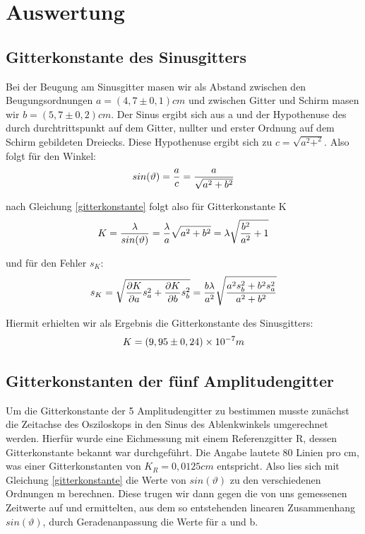 \documentclass[12pt]{article}
\begin{document}
\newpage

\section{Auswertung}
\subsection{Gitterkonstante des Sinusgitters}
Bei der Beugung am Sinusgitter masen wir als Abstand zwischen den Beugungsordnungen $a=(4,7 \pm 0,1)cm$ und zwischen Gitter und Schirm masen wir $b=(5,7\pm0,2)cm$. Der Sinus ergibt sich aus a und der Hypothenuse des durch durchtrittspunkt auf dem Gitter, nullter und erster Ordnung auf dem Schirm gebildeten Dreiecks. Diese Hypothenuse ergibt sich zu $c=\sqrt{a^2+^2}$. Also folgt für den Winkel:
\begin{align}
\notag
 sin(\vartheta)=\frac{a}{c}=\frac{a}{\sqrt{a^2+b^2}}
\end{align}

nach Gleichung \ref{gitterkonstante} folgt also für Gitterkonstante K
\begin{align}
\notag
 K=\frac{\lambda}{sin(\vartheta)}=\frac{\lambda}{a}\sqrt{a^2+b^2}= \lambda\sqrt{\frac{b^2}{a^2}+1}
\end{align}

und für den Fehler $s_K$:
\begin{align}
\notag
 s_K=\sqrt{\frac{\partial K}{\partial a}s_a^2+\frac{\partial K}{\partial b}s_b^2}=\frac{b\lambda}{a^2}\sqrt{\frac{a^2s_b^2+b^2s_a^2}{a^2+b^2}}
\end{align}

Hiermit erhielten wir als Ergebnis die Gitterkonstante des Sinusgitters:
\begin{align}
\notag
 K=(9,95\pm0,24)\times10^{-7}m
\end{align}
\subsection{Gitterkonstanten der fünf Amplitudengitter}
Um die Gitterkonstante der 5 Amplitudengitter zu bestimmen musste zunächst die Zeitachse des Osziloskops in den Sinus des Ablenkwinkels umgerechnet werden. Hierfür wurde eine Eichmessung mit einem Referenzgitter R, dessen Gitterkonstante bekannt war durchgeführt. Die Angabe lautete 80 Linien pro cm, was einer Gitterkonstanten von $K_R=0,0125cm$ entspricht. Also lies sich mit Gleichung \ref{gitterkonstante} die Werte von $sin(\vartheta)$ zu den verschiedenen Ordnungen m berechnen. Diese trugen wir dann gegen die von uns gemessenen Zeitwerte auf und ermittelten, aus dem so entstehenden linearen Zusammenhang $sin(\vartheta)$, durch Geradenanpassung die Werte für a und b.
\end{document}

